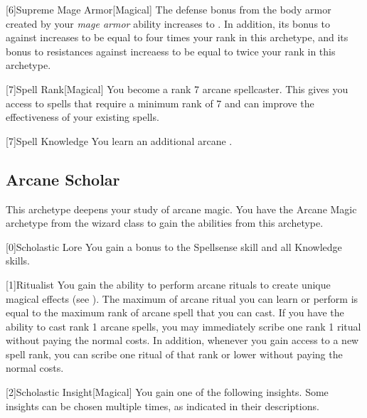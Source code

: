         [6]{Supreme Mage Armor}[Magical]
        The defense bonus from the body armor created by your \textit{mage armor} ability increases to .
        In addition, its bonus to  against  increases to be equal to four times your rank in this archetype, and its bonus to resistances against  increaess to be equal to twice your rank in this archetype.

        [7]{Spell Rank}[Magical] You become a rank 7 arcane spellcaster.
        This gives you access to spells that require a minimum rank of 7 and can improve the effectiveness of your existing spells.

        [7]{Spell Knowledge} You learn an additional arcane .

    \newpage
    \subsection{Arcane Scholar}
        This archetype deepens your study of arcane magic.
        You have the Arcane Magic archetype from the wizard class to gain the abilities from this archetype.

        [0]{Scholastic Lore} You gain a  bonus to the Spellsense skill and all Knowledge skills.

        [1]{Ritualist} You gain the ability to perform arcane rituals to create unique magical effects (see ).
        The maximum  of arcane ritual you can learn or perform is equal to the maximum rank of arcane spell that you can cast.
        If you have the ability to cast rank 1 arcane spells, you may immediately scribe one rank 1 ritual without paying the normal costs.
        In addition, whenever you gain access to a new spell rank, you can scribe one ritual of that rank or lower without paying the normal costs.

        [2]{Scholastic Insight}[Magical]
        You gain one of the following insights.
        Some insights can be chosen multiple times, as indicated in their descriptions.

